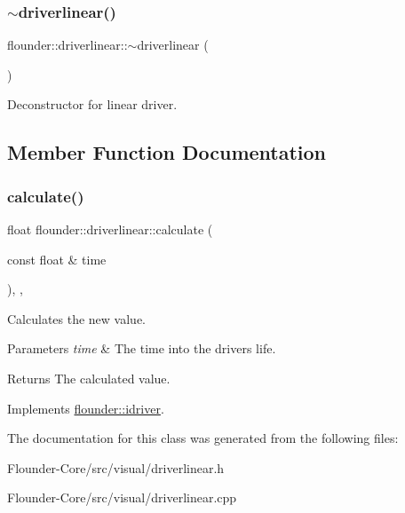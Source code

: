 \subsubsection{\texorpdfstring{$\sim$driverlinear()}{~driverlinear()}}
{\footnotesize\ttfamily flounder\+::driverlinear\+::$\sim$driverlinear (\begin{DoxyParamCaption}{ }\end{DoxyParamCaption})}



Deconstructor for linear driver. 



\subsection{Member Function Documentation}
\mbox{\label{classflounder_1_1driverlinear_a7f645c05d7a8bdb555bbf70aca7c630e}} 
\subsubsection{\texorpdfstring{calculate()}{calculate()}}
{\footnotesize\ttfamily float flounder\+::driverlinear\+::calculate (\begin{DoxyParamCaption}\item[{const float \&}]{time }\end{DoxyParamCaption})\hspace{0.3cm}{\ttfamily [override]}, {\ttfamily [protected]}, {\ttfamily [virtual]}}



Calculates the new value. 


\begin{DoxyParams}{Parameters}
{\em time} & The time into the drivers life. \\
\hline
\end{DoxyParams}
\begin{DoxyReturn}{Returns}
The calculated value. 
\end{DoxyReturn}


Implements \hyperlink{classflounder_1_1idriver_a034c4159dc98c4c37ffdfaae64e4a16d}{flounder\+::idriver}.



The documentation for this class was generated from the following files\+:\begin{DoxyCompactItemize}
\item 
Flounder-\/\+Core/src/visual/driverlinear.\+h\item 
Flounder-\/\+Core/src/visual/driverlinear.\+cpp\end{DoxyCompactItemize}
